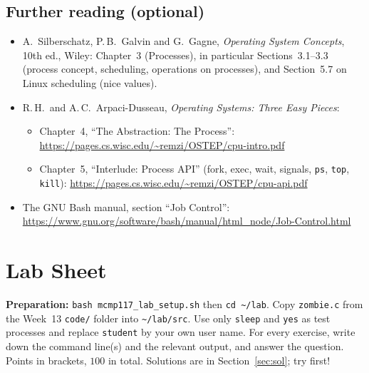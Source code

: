 \documentclass[11pt,a4paper]{article}
\newcommand{\cmd}[1]{\texttt{#1}}
\begin{document}
\subsection*{Further reading (optional)}
\begin{itemize}
  \item A.\ Silberschatz, P.\,B.\ Galvin and G.\ Gagne, \emph{Operating System Concepts}, 10th ed., Wiley: Chapter~3 (Processes), in particular Sections~3.1--3.3 (process concept, scheduling, operations on processes), and Section~5.7 on Linux scheduling (nice values).
  \item R.\,H.\ and A.\,C.\ Arpaci-Dusseau, \emph{Operating Systems: Three Easy Pieces}:
  \begin{itemize}
    \item Chapter~4, ``The Abstraction: The Process'': \url{https://pages.cs.wisc.edu/~remzi/OSTEP/cpu-intro.pdf}
    \item Chapter~5, ``Interlude: Process API'' (fork, exec, wait, signals, \cmd{ps}, \cmd{top}, \cmd{kill}): \url{https://pages.cs.wisc.edu/~remzi/OSTEP/cpu-api.pdf}
  \end{itemize}
  \item The GNU Bash manual, section ``Job Control'': \url{https://www.gnu.org/software/bash/manual/html_node/Job-Control.html}
\end{itemize}

\section{Lab Sheet}
\label{sec:lab}

\textbf{Preparation:} \cmd{bash mcmp117\_lab\_setup.sh} then \cmd{cd \textasciitilde/lab}. Copy \texttt{zombie.c} from the Week~13 \texttt{code/} folder into \texttt{\textasciitilde/lab/src}. Use only \cmd{sleep} and \cmd{yes} as test processes and replace \texttt{student} by your own user name. For every exercise, write down the command line(s) and the relevant output, and answer the question. Points in brackets, $100$ in total. Solutions are in Section~\ref{sec:sol}; try first!
\end{document}

